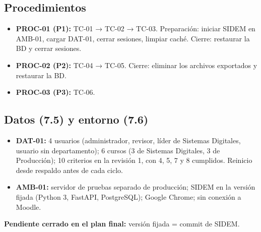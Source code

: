 \documentclass[11pt,a4paper,oneside]{report}
\newcommand{\code}[1]{\leavevmode{\ttfamily\color{tinta}#1}}
\begin{document}
\subsection*{Procedimientos}

\begin{itemize}
\item \textbf{PROC-01 (P1):} TC-01 → TC-02 → TC-03. Preparación: iniciar SIDEM en AMB-01, cargar DAT-01, cerrar sesiones, limpiar caché. Cierre: restaurar la BD y cerrar sesiones.
\item \textbf{PROC-02 (P2):} TC-04 → TC-05. Cierre: eliminar los archivos exportados y restaurar la BD.
\item \textbf{PROC-03 (P3):} TC-06.
\end{itemize}

\subsection*{Datos (7.5) y entorno (7.6)}

\begin{itemize}
\item \textbf{DAT-01:} 4 usuarios (administrador, revisor, líder de Sistemas Digitales, usuario sin departamento); 6 cursos (3 de Sistemas Digitales, 3 de Producción); 10 criterios en la revisión 1, con 4, 5, 7 y 8 cumplidos. Reinicio desde respaldo antes de cada ciclo.
\item \textbf{AMB-01:} servidor de pruebas separado de producción; SIDEM en la versión fijada (Python 3, FastAPI, PostgreSQL); Google Chrome; sin conexión a Moodle.
\end{itemize}

\textbf{Pendiente cerrado en el plan final:} versión fijada = commit \code{77f71b2} de SIDEM.
\end{document}
